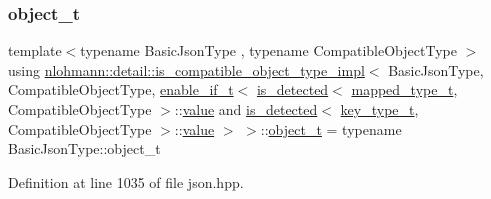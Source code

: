 \subsubsection{\texorpdfstring{object\_t}{object\_t}}
{\footnotesize\ttfamily template$<$typename Basic\+Json\+Type , typename Compatible\+Object\+Type $>$ \\
using \mbox{\hyperlink{structnlohmann_1_1detail_1_1is__compatible__object__type__impl}{nlohmann\+::detail\+::is\+\_\+compatible\+\_\+object\+\_\+type\+\_\+impl}}$<$ Basic\+Json\+Type, Compatible\+Object\+Type, \mbox{\hyperlink{namespacenlohmann_1_1detail_a02bcbc878bee413f25b985ada771aa9c}{enable\+\_\+if\+\_\+t}}$<$ \mbox{\hyperlink{namespacenlohmann_1_1detail_a9135fcf616d6ac6e231a86e0a055ac44}{is\+\_\+detected}}$<$ \mbox{\hyperlink{namespacenlohmann_1_1detail_a9c1795c148875722f8482d39e0eb9364}{mapped\+\_\+type\+\_\+t}}, Compatible\+Object\+Type $>$\+::\mbox{\hyperlink{structnlohmann_1_1detail_1_1is__compatible__object__type__impl_3_01_basic_json_type_00_01_compatfbe9a153c4ecce445c98bbdd2d65f605_adc8188ae8d65e8175d961cd461a8ee43}{value}} and \mbox{\hyperlink{namespacenlohmann_1_1detail_a9135fcf616d6ac6e231a86e0a055ac44}{is\+\_\+detected}}$<$ \mbox{\hyperlink{namespacenlohmann_1_1detail_a66dfe39f03b05d6b7265a0ff748d64ef}{key\+\_\+type\+\_\+t}}, Compatible\+Object\+Type $>$\+::\mbox{\hyperlink{structnlohmann_1_1detail_1_1is__compatible__object__type__impl_3_01_basic_json_type_00_01_compatfbe9a153c4ecce445c98bbdd2d65f605_adc8188ae8d65e8175d961cd461a8ee43}{value}} $>$ $>$\+::\mbox{\hyperlink{structnlohmann_1_1detail_1_1is__compatible__object__type__impl_3_01_basic_json_type_00_01_compatfbe9a153c4ecce445c98bbdd2d65f605_a551e9ee372c1b24b632e6b668c231a62}{object\+\_\+t}} =  typename Basic\+Json\+Type\+::object\+\_\+t}



Definition at line 1035 of file json.\+hpp.



